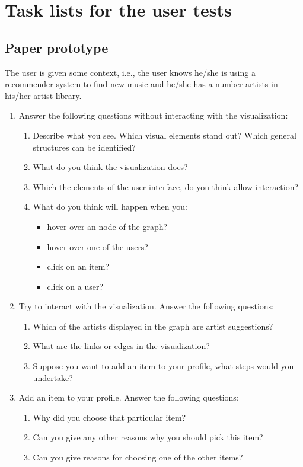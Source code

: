\chapter{Task lists for the user tests}\label{appendix:tasklists}

\section{Paper prototype}\label{appendix:tasklists:prototype1}

The user is given some context, i.e., the user knows he/she is using a recommender system to find new music and he/she has a number artists in his/her artist library.

\begin{enumerate}
	\item Answer the following questions without interacting with the visualization:
		\begin{enumerate}
			\item Describe what you see. Which visual elements stand out? Which general structures can be identified?
			\item What do you think the visualization does?
			\item Which the elements of the user interface, do you think allow interaction?
			\item What do you think will happen when you:
				\begin{itemize}
					\item hover over an node of the graph?
					\item hover over one of the users?
					\item click on an item?
					\item click on a user?
				\end{itemize}
		\end{enumerate}
	\item Try to interact with the visualization. Answer the following questions:
		\begin{enumerate}
			\item Which of the artists displayed in the graph are artist suggestions?
			\item What are the links or edges in the visualization?
			\item	Suppose you want to add an item to your profile, what steps would you undertake?
		\end{enumerate}
	\item Add an item to your profile. Answer the following questions:
		\begin{enumerate}
			\item Why did you choose that particular item?
			\item Can you give any other reasons why you should pick this item?
			\item Can you give reasons for choosing one of the other items?
		\end{enumerate}
\end{enumerate}




